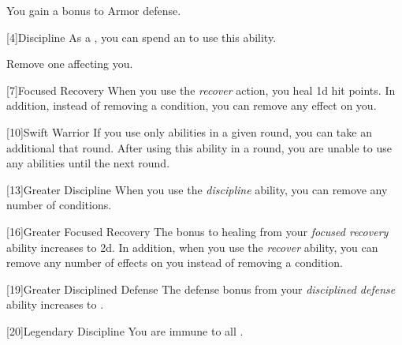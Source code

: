         You gain a  bonus to Armor defense.

        [4]{Discipline} As a , you can spend an  to use this ability.
        \begin{ability}
            \begin{spelleffects}
                \spelleffect Remove one  affecting you.
            \end{spelleffects}
        \end{ability}

        [7]{Focused Recovery}
        When you use the \textit{recover} action, you heal \plus1d hit points.
        In addition, instead of removing a condition, you can remove any  effect on you.

        [10]{Swift Warrior}
        If you use only  abilities in a given round, you can take an additional  that round.
        After using this ability in a round, you are unable to use any  abilities until the next round.

        [13]{Greater Discipline}
        When you use the \textit{discipline} ability, you can remove any number of conditions.

        [16]{Greater Focused Recovery}
        The bonus to healing from your \textit{focused recovery} ability increases to \plus2d.
        In addition, when you use the \textit{recover} ability, you can remove any number of  effects on you instead of removing a condition.

        [19]{Greater Disciplined Defense}
        The defense bonus from your \textit{disciplined defense} ability increases to .

        [20]{Legendary Discipline} 
        You are immune to all .

